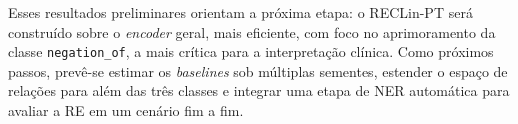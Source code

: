 \documentclass[12pt]{article}
\begin{document}
Esses resultados preliminares orientam a próxima etapa: o RECLin-PT será
construído sobre o \emph{encoder} geral, mais eficiente, com foco no aprimoramento
da classe \texttt{negation\_of}, a mais crítica para a interpretação clínica. Como
próximos passos, prevê-se estimar os \emph{baselines} sob múltiplas sementes,
estender o espaço de relações para além das três classes e integrar uma etapa de
NER automática para avaliar a RE em um cenário fim a fim.



\end{document}
